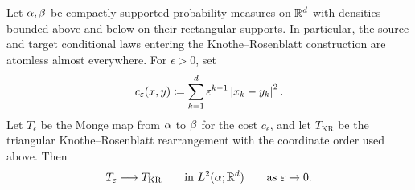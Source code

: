 \begin{prop}\label{prop-knothe-limit-anisotropic-brenier}
	Let $\alpha,\beta$ be compactly supported probability measures on $\mathbb{R}^d$ with densities bounded above and below on their rectangular supports. In particular, the source and target conditional laws entering the Knothe--Rosenblatt construction are atomless almost everywhere. For $\epsilon>0$, set
	\[
		c_\varepsilon(x,y)
		\coloneqq
		\sum_{k=1}^d \varepsilon^{k-1}\left\lvert x_k-y_k\right\rvert^2.
	\]
	Let $T_\epsilon$ be the Monge map from $\alpha$ to $\beta$ for the cost $c_\epsilon$, and let $T_{\mathrm{KR}}$ be the triangular Knothe--Rosenblatt rearrangement with the coordinate order used above. Then
	\[
		T_\varepsilon \longrightarrow T_{\mathrm{KR}}
		\qquad\text{in } L^2(\alpha;\mathbb{R}^d)
		\qquad\text{as } \varepsilon\to0.
	\]
\end{prop}

